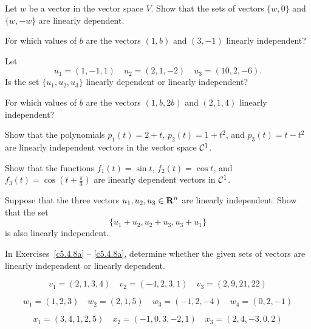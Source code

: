 \EXER

\TEXER

\begin{exercise} \label{c5.4.1}
Let $w$ be a vector in the vector space $V$.  Show that the sets of vectors
$\{w,0\}$ and $\{w,-w\}$ are linearly dependent.
\end{exercise}

\begin{exercise} \label{c5.4.2}
For which values of $b$ are the vectors $(1,b)$ and $(3,-1)$
linearly independent?
\end{exercise}

\begin{exercise} \label{c5.4.3}
Let
\[
u_1=(1,-1,1) \quad u_2=(2,1,-2) \quad u_3 = (10,2,-6).
\]
Is the set $\{u_1,u_2,u_3\}$ linearly dependent or linearly independent?
\end{exercise}


\begin{exercise} \label{c5.4.4}
For which values of $b$ are the vectors $(1,b,2b)$ and $(2,1,4)$
linearly independent?
\end{exercise}

\begin{exercise} \label{c5.4.5}
Show that the polynomials $p_1(t) = 2+t$, $p_2(t) = 1+t^2$, and
$p_3(t) = t-t^2$ are linearly independent vectors in the vector
space ${\cal C}^1$.
\end{exercise}

\begin{exercise} \label{c5.4.6}
Show that the functions $f_1(t) = \sin t$, $f_2(t)=\cos t$, and
$f_3(t)=\cos\left(t+\frac{\pi}{3}\right)$ are linearly dependent
vectors in ${\cal C}^1$.
\end{exercise}

\begin{exercise} \label{c5.4.7}
Suppose that the three vectors $u_1,u_2,u_3\in\mbox{$\bf{R}$}^n$ are linearly
independent.  Show that the set
\[
\{u_1+u_2, u_2+u_3,u_3+u_1\}
\]
is also linearly independent.
\end{exercise}

\CEXER

\noindent In Exercises~\ref{c5.4.8a} -- \ref{c5.4.8a}, determine whether
the given sets of vectors are linearly independent or linearly dependent.
\begin{exercise} \label{c5.4.8a}
\begin{equation*}
v_1 = (2,1,3,4) \quad v_2 = (-4,2,3,1) \quad v_3 = (2,9,21,22)
\end{equation*}
\end{exercise}
\begin{exercise} \label{c5.4.8b}
\begin{equation*}
w_1 = (1,2,3)\quad w_2 = (2,1,5) \quad w_3 = (-1,2,-4)
\quad w_4 = (0,2,-1)
\end{equation*}
\end{exercise}
\begin{exercise} \label{c5.4.8c}
\begin{equation*}
x_1 = (3,4,1,2,5) \quad x_2 = (-1,0,3,-2,1)\quad x_3 = (2,4,-3,0,2)
\end{equation*}
\end{exercise}

